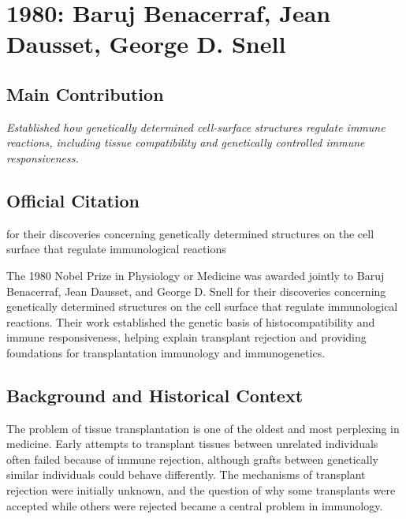 \chapter[1980 --- Benacerraf et al.]{1980: Baruj Benacerraf, Jean Dausset, George D. Snell}
\label{ch:1980_Benacerraf}

\section*{Main Contribution}

\textit{Established how genetically determined cell-surface structures regulate immune reactions, including tissue compatibility and genetically controlled immune responsiveness.}\cite{nobel-1980,lecture-1980,lecture-dausset-1980,lecture-snell-1980}

\section{Official Citation}

for their discoveries concerning genetically determined structures on the cell surface that regulate immunological reactions

The 1980 Nobel Prize in Physiology or Medicine was awarded jointly to Baruj Benacerraf, Jean Dausset, and George D. Snell for their discoveries concerning genetically determined structures on the cell surface that regulate immunological reactions. Their work established the genetic basis of histocompatibility and immune responsiveness, helping explain transplant rejection and providing foundations for transplantation immunology and immunogenetics.

\section{Background and Historical Context}

The problem of tissue transplantation is one of the oldest and most perplexing in medicine. Early attempts to transplant tissues between unrelated individuals often failed because of immune rejection, although grafts between genetically similar individuals could behave differently. The mechanisms of transplant rejection were initially unknown, and the question of why some transplants were accepted while others were rejected became a central problem in immunology.

